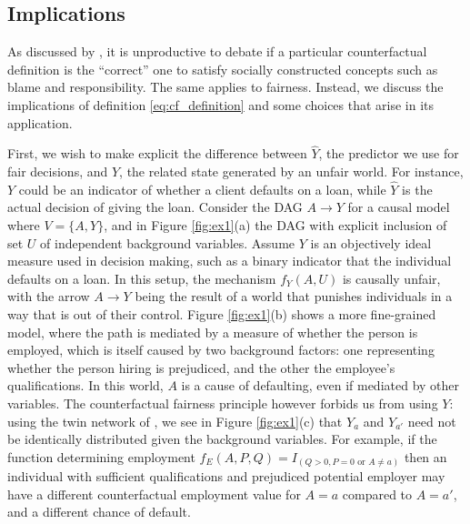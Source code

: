 \subsection{Implications}
%
As discussed by \cite{halpern:16}, it is unproductive to debate
if a particular counterfactual definition is the ``correct'' one
to satisfy socially constructed concepts such as blame and responsibility.
The same applies to fairness. Instead, we discuss the
implications of definition \eqref{eq:cf_definition} and some choices
that arise in its application.

First, we wish to make explicit the difference between $\hat Y$, the
predictor we use for fair decisions, and $Y$, the related state
generated by an unfair world. For instance, $Y$ could be an indicator
of whether a client defaults on a loan, while $\hat Y$ is the actual
decision of giving the loan. Consider the DAG $A \rightarrow Y$ for a
causal model where $V = \{A, Y\}$, and in Figure \ref{fig:ex1}(a) the
DAG with explicit inclusion of set $U$ of independent background
variables. Assume $Y$ is an objectively ideal measure used in decision
making, such as a binary indicator that the individual defaults on a
loan. In this setup, the mechanism $f_Y(A, U)$ is causally unfair,
with the arrow $A \rightarrow Y$ being the result of a world that
punishes individuals in a way that is out of their control. Figure
\ref{fig:ex1}(b) shows a more fine-grained model, where the path is
mediated by a measure of whether the person is employed, which is
itself caused by two background factors: one representing whether the
person hiring is prejudiced, and the other the employee's
qualifications. %
In this world,
$A$ is a cause of defaulting, even if mediated by other
variables. The counterfactual fairness principle however forbids us
from using $Y$: using the twin network of
\citet{pearl:00}, we see in Figure \ref{fig:ex1}(c) that $Y_a$ and
$Y_{a'}$ need not be identically distributed given the
background variables.
For example, if the function determining employment
$f_E(A,P,Q) = I_{(Q > 0, P = 0 \text{ or } A \neq a)}$ then an individual
with sufficient qualifications and prejudiced potential employer
may have a different counterfactual
employment value for $A = a$ compared to $A = a'$, and a different chance of default.


